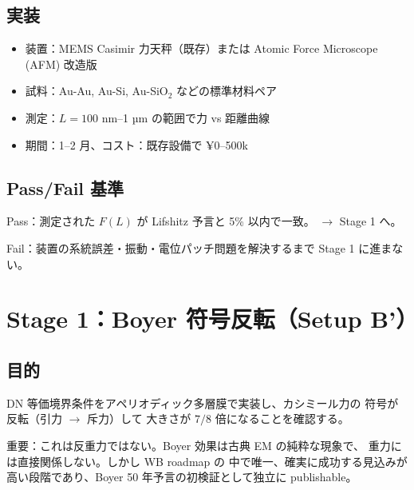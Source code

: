 \documentclass[11pt,a4paper]{article}
\def\textbf#1{#1}%
\begin{document}
\subsection{実装}

\begin{itemize}
\item 装置：MEMS Casimir 力天秤（既存）または Atomic Force Microscope (AFM) 改造版
\item 試料：Au-Au, Au-Si, Au-SiO$_2$ などの標準材料ペア
\item 測定：$L = 100$ nm--1 µm の範囲で力 vs 距離曲線
\item 期間：1--2 月、コスト：既存設備で ¥0--500k
\end{itemize}

\subsection{Pass/Fail 基準}

\textbf{Pass}：測定された $F(L)$ が Lifshitz 予言と 5\% 以内で一致。
$\to$ Stage 1 へ。

\textbf{Fail}：装置の系統誤差・振動・電位パッチ問題を解決するまで Stage 1 に進まない。

\newpage

\section{Stage 1：Boyer 符号反転（Setup B'）}

\subsection{目的}

DN 等価境界条件をアペリオディック多層膜で実装し、カシミール力の \textbf{符号が
反転}（引力 $\to$ 斥力）して \textbf{大きさが $7/8$ 倍}になることを確認する。

\textbf{重要}：これは反重力ではない。Boyer 効果は古典 EM の純粋な現象で、
重力には直接関係しない。しかし WB roadmap の \textbf{中で唯一、確実に成功する見込みが
高い段階}であり、Boyer 50 年予言の初検証として独立に publishable。
\end{document}
